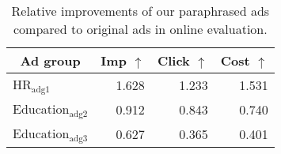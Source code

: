 \begin{table}[t]
\centering
{\small
\begin{tabular}{lrrr}
\toprule
\multicolumn{1}{c}{\textbf{Ad group}}
& \multicolumn{1}{c}{\textbf{Imp} $\uparrow$}
& \multicolumn{1}{c}{\textbf{Click} $\uparrow$} 
& \multicolumn{1}{c}{\textbf{Cost} $\uparrow$} \\
\midrule
HR$_\mathrm{adg1}$ & 1.628 & 1.233 & 1.531 \\
Education$_\mathrm{adg2}$ & 0.912 & 0.843 & 0.740 \\
Education$_\mathrm{adg3}$ & 0.627 & 0.365 & 0.401 \\ \bottomrule
\end{tabular}}
\caption{Relative improvements of our paraphrased ads compared to original ads in online evaluation.}\label{table:online_evaluation}
\end{table}